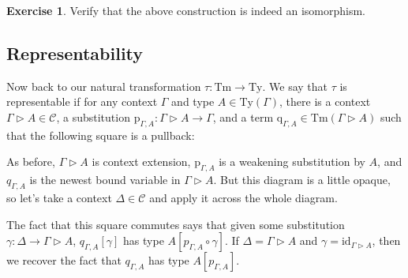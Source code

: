 \documentclass{article}
\renewcommand{\_}{\textrm{\textscale{.5}{\textunderscore}}}
\newcommand{\Tm}{\mathrm{Tm}}
\newcommand{\Ty}{\mathrm{Ty}}
\newcommand{\id}{\mathrm{id}}
\newcommand{\p}{\mathrm{p}}
\newcommand{\q}{\mathrm{q}}
\newcommand{\yo}{\text{\large \jpfont よ}}
\theoremstyle{definition}
\newtheorem{exercise}[definition]{Exercise}
\theoremstyle{plain}
\begin{document}
\begin{exercise}
Verify that the above construction is indeed an isomorphism.
\end{exercise}

\subsection{Representability}

Now back to our natural transformation $\tau : \Tm \to \Ty$.
We say that $\tau$ is representable if for any context $\Gamma$ and type $A \in \Ty(\Gamma)$,
there is a context $\Gamma \rhd A \in \mathcal{C}$,
a substitution $\p_{\Gamma, A} : \Gamma \rhd A \to \Gamma$,
and a term $\q_{\Gamma, A} \in \Tm(\Gamma \rhd A)$
such that the following square is a pullback:

\begin{center}
\end{center}

As before, $\Gamma \rhd A$ is context extension,
$\p_{\Gamma, A}$ is a weakening substitution by $A$, and
$q_{\Gamma, A}$ is the newest bound variable in $\Gamma \rhd A$.
But this diagram is a little opaque, so let's take a context $\Delta \in \mathcal{C}$ and apply it across the whole diagram.

\begin{center}
\end{center}

The fact that this square commutes says that given some substitution $\gamma : \Delta \to \Gamma \rhd A$,
$q_{\Gamma, A}[\gamma]$ has type $A[p_{\Gamma, A} \circ \gamma]$.
If $\Delta = \Gamma \rhd A$ and $\gamma = \id_{\Gamma \rhd A}$,
then we recover the fact that $q_{\Gamma, A}$ has type $A[p_{\Gamma, A}]$.
\end{document}
